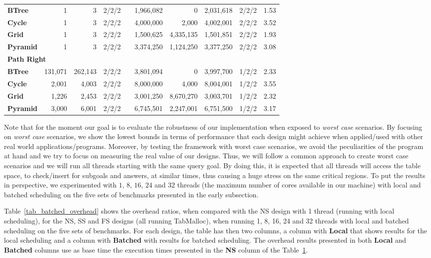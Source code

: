\documentclass{llncs}
\begin{document}
\begin{table}[ht]
{\begin{tabular}{lrrccrrrcc}
\bf{BTree}    &       1 &       3 & 2/2/2 && 1,966,082 &         0 &
2,031,618 &    2/2/2 &   1.53 \\
\bf{Cycle}    &       1 &       3 & 2/2/2 && 4,000,000 &     2,000 &
4,002,001 &    2/2/2 &   3.52 \\
\bf{Grid}     &       1 &       3 & 2/2/2 && 1,500,625 & 4,335,135 &
1,501,851 &    2/2/2 &  1.93 \\
\bf{Pyramid}  &       1 &       3 & 2/2/2 && 3,374,250 & 1,124,250 &
3,377,250 &    2/2/2 &   3.08 \\
\hline
\multicolumn{10}{l}{\bf Path Right} \\
\bf{BTree}    & 131,071 & 262,143 & 2/2/2 && 3,801,094 &         0 &
3,997,700 &    1/2/2 &  2.33 \\
\bf{Cycle}    &   2,001 &   4,003 & 2/2/2 && 8,000,000 &     4,000 &
8,004,001 &    1/2/2 &  3.55 \\
\bf{Grid}     &   1,226 &   2,453 & 2/2/2 && 3,001,250 & 8,670,270 &
3,003,701 &    1/2/2 &  2.32 \\
\bf{Pyramid}  &   3,000 &   6,001 & 2/2/2 && 6,745,501 & 2,247,001 &
6,751,500 &    1/2/2 &  3.17 \\
\hline\hline
\end{tabular}}
\label{tab_benchs}
\end{table}

Note that for the moment our goal is to evaluate the robustness of our
implementation when exposed to \emph{worst case} scenarios. By
focusing on \emph{worst case} scenarios, we show the lowest bounds in
terms of performance that each design might achieve when applied/used
with other real world applications/programs. Moreover, by testing the
framework with worst case scenarios, we avoid the peculiarities of the
program at hand and we try to focus on measuring the real value of our
designs. Thus, we will follow a common approach to create worst case
scenarios and we will run all threads starting with the same query
goal. By doing this, it is expected that all threads will access the
table space, to check/insert for subgoals and answers, at similar
times, thus causing a huge stress on the same critical regions. To put
the results in perspective, we experimented with $1$, $8$, $16$, $24$
and $32$ threads (the maximum number of cores available in our
machine) with local and batched scheduling on the five sets of
benchmarks presented in the early subsection.

Table~\ref{tab_batched_overhead} shows the overhead ratios, when
compared with the NS design with 1 thread (running with local
scheduling), for the NS, SS and FS designs (all running TabMalloc),
when running 1, 8, 16, 24 and 32 threads with local and batched
scheduling on the five sets of benchmarks. For each design, the table
has then two columns, a column with {\bf Local} that shows results for
the local scheduling and a column with {\bf Batched} with results for
batched scheduling. The overhead results presented in both {\bf Local}
and {\bf Batched} columns use as base time the execution times
presented in the {\bf NS} column of the Table~\ref{tab_benchs}.
\end{document}

